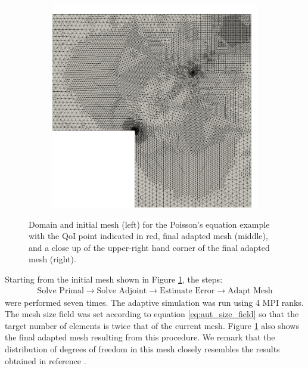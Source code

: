 \begin{figure}[ht!]
\begin{subfigure}{0.31\textwidth}
\end{subfigure}%
\begin{subfigure}{0.32\textwidth}
\centering
\includegraphics[width=.99\linewidth]{img/aut_squarehole_unif_close.png}
\end{subfigure}
\caption{Domain and initial mesh (left) for the Poisson's equation example
with the QoI point indicated in red, final adapted mesh (middle), and
a close up of the upper-right hand corner of the final adapted mesh (right).}
\label{fig:aut_poisson_meshes}
\end{figure}

Starting from the initial mesh shown in Figure \ref{fig:aut_poisson_meshes},
the steps:
%
\begin{gather*}
\text{Solve Primal} \rightarrow \text{Solve Adjoint} \rightarrow
\text{Estimate Error} \rightarrow \text{Adapt Mesh}
\end{gather*}
%
were performed seven times. The adaptive simulation was run using
4 MPI ranks. The mesh size field was set according to
equation \eqref{eq:aut_size_field} so that the target number of elements
is twice that of the current mesh. Figure \ref{fig:aut_poisson_meshes}
also shows the final adapted mesh resulting from this procedure. We remark
that the distribution of degrees of freedom in this mesh closely
resembles the results obtained in reference \cite{dealiistep14}.

